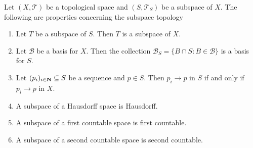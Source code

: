 \begin{proposition}\label{prop: subspace properties}
Let \((X, \mathcal T)\) be a topological space and \((S, \mathcal T_S)\) be a
subspace of \(X\). The following are properties concerning the subspace
topology
\begin{enumerate}[(SP1)]
  \item\label{prop: subspace transitivity}
    Let \(T\) be a subspace of \(S\). Then \(T\) is a subspace of \(X\).  \item\label{prop: basis for subspace} Let \(\mathcal B\) be a basis for \(X\). Then the collection \(\mathcal B_S = \{B \cap S \colon B \in \mathcal B\}\) is a basis for \(S\).
  \item\label{prop: convergence subspace}
    Let \((p_i)_{i \in \mathbf{N}} \subseteq S\) be a sequence and \(p \in
    S\). Then \(p_i \to p\) in \(S\) if and only if \(p_i \to p\) in \(X\).
  \item\label{prop: Hausdorff implies Hausdorff subspace}
    A subspace of a Hausdorff space is Hausdorff.
  \item\label{prop: firs count implies first count subspace}
    A subspace of a first countable space is first countable.
  \item\label{prop: sec count implies sec count subspace}
    A subspace of a second countable space is second countable.
\end{enumerate}
\end{proposition}

